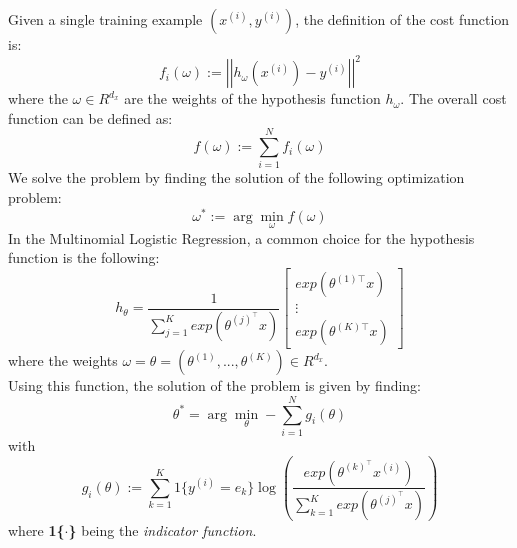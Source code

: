 \documentclass[a4paper,11pt,oneside]{book}
\begin{document}
Given a single training example $(x^{(i)}, y^{(i)})$, the definition of the cost function is:
\begin{equation}
f_i\left(\omega\right):=\left|\left|h_\omega\left(x^{(i)}\right)-y^{(i)}\right|\right|^2
\end{equation}
where the $\omega \in R^{d_{x}}$ are the weights of the hypothesis function $h_{\omega}$. The overall cost function can be defined as:
\begin{equation}
f\left(\omega\right):=\sum_{i=1}^{N}{f_i\left(\omega\right)}
\end{equation}
We solve the problem by finding the solution of the following optimization problem:
\begin{equation}
\omega^*:=\arg\min_\omega f\left(\omega\right)
\end{equation}
In the Multinomial Logistic Regression, a common choice for the hypothesis function is the following:
\begin{equation}
h_\theta=\frac{1}{\sum_{j=1}^{K}{exp\left(\theta^{(j)^\top}x\right)}}\begin{bmatrix}exp\left(\theta^{(1)\top}x\right)  \\ \vdots \\ exp\left(\theta^{(K)\top}x\right) \end{bmatrix}
\end{equation}
where the weights $\omega = \theta = (\theta^{(1)}, ..., \theta^{(K)}) \in R^{d_{x}}$. \\
Using this function, the solution of the problem is given by finding:
\begin{equation}
\theta^*=\arg\min_\theta -\sum_{i=1}^{N}{g_i(\theta)}
\end{equation}
with
\begin{equation}
g_i\left(\theta\right):=\sum_{k=1}^{K}{1\{y^{(i)}=e_k\}\log{\left( \frac{exp(\theta^{(k)^\top}x^{(i)})}{\sum_{k=1}^{K}{exp( \theta^{(j)^\top}x )}} \right)}}
\end{equation}
where \textbf{1\{$\cdot$\}} being the \textit{indicator function}.\cite{CITATION:2}
\end{document}
